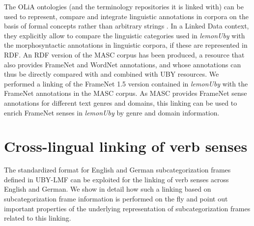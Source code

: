 The OLiA ontologies (and the terminology repositories it is linked with) 
can be used to represent, compare and integrate linguistic annotations in corpora on the basis of formal concepts rather than arbitrary strings \cite{chiarcos2010towards}.
In a Linked Data context, they explicitly allow to compare the linguistic categories used in \emph{lemonUby}
 with the morphosyntactic annotations in linguistic corpora, if these are represented in RDF. 
An RDF version of the MASC corpus \cite{ide-etal08-masc} has been produced,
a resource that also provides FrameNet and WordNet annotations, and whose annotations can thus be directly compared with and combined with UBY resources.
We performed a linking of the FrameNet 1.5 version contained in \emph{lemonUby}
with the FrameNet annotations in the MASC corpus. As MASC provides FrameNet sense annotations
for different text genres and domains, this linking can be used to enrich FrameNet senses in
\emph{lemonUby} by genre and domain information. 

\section{Cross-lingual linking of verb senses}
The standardized format for English and German subcategorization frames defined in UBY-LMF can be exploited for the 
 linking of verb senses across English and German. We show in detail how such a linking based on
subcategorization frame information is performed on the fly and point out important properties of
the underlying representation of subcategorization frames related to this linking.
 
